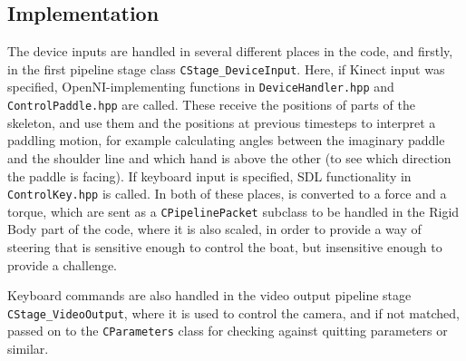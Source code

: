 \subsection{Implementation}
The device inputs are handled in several different places in the code, and firstly, in the first pipeline stage class \texttt{CStage_DeviceInput}. Here, if Kinect input was specified, OpenNI-implementing functions in \texttt{DeviceHandler.hpp} and \texttt{ControlPaddle.hpp} are called. These receive the positions of parts of the skeleton, and use them and the positions at previous timesteps to interpret a paddling motion, for example calculating angles between the imaginary paddle and the shoulder line and which hand is above the other (to see which direction the paddle is facing). If keyboard input is specified, SDL functionality in \texttt{ControlKey.hpp} is called. In both of these places, is converted to a force and a torque, which are sent as a \texttt{CPipelinePacket} subclass to be handled in the Rigid Body part of the code, where it is also scaled, in order to provide a way of steering that is sensitive enough to control the boat, but insensitive enough to provide a challenge.

Keyboard commands are also handled in the video output pipeline stage \texttt{CStage_VideoOutput}, where it is used to control the camera, and if not matched, passed on to the \texttt{CParameters} class for checking against quitting parameters or similar.


